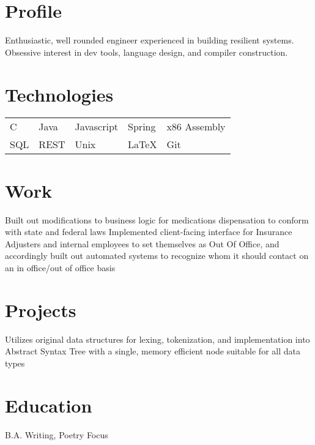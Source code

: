 \documentclass{my_cv}
\begin{document}

 \vspace{1mm}
 \vspace{1mm}

\section{Profile}
\small{Enthusiastic, well rounded engineer experienced in building resilient systems. 
Obsessive interest in dev tools, language design, and compiler construction.}

\section{Technologies}
\begin{tabular}{l l l l l}
    C & Java & Javascript & Spring & x86 Assembly\\
    SQL & REST & Unix & \LaTeX{} & Git
\end{tabular}
 
\section{Work}
{Built out modifications to business logic for medications dispensation to conform with state and federal laws}
{Implemented client-facing interface for Insurance Adjusters and internal employees to set themselves as Out Of Office,
and accordingly built out automated systems to recognize whom it should contact on an in office/out of office basis} 

\section{Projects}
{Utilizes original data structures for lexing, tokenization, and implementation into Abstract Syntax Tree 
with a single, memory efficient node suitable for all data types}

\section{Education}
B.A. Writing, Poetry Focus
\end{document}
